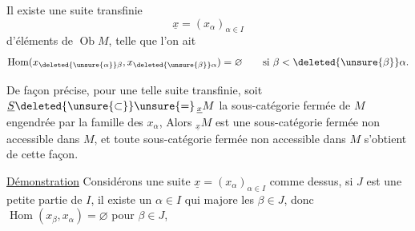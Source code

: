 Il existe une suite transfinie
\[
\underline x=(x_\alpha)_{\alpha\in I}
\]
d'éléments de $\operatorname{Ob}M$, telle que l'on ait
\[
\operatorname{Hom}(x_{\deleted{\unsure{\alpha}}\beta},x_{\deleted{\unsure{\beta}}\alpha})=\varnothing\qquad\text{si }\beta<\deleted{\unsure{\beta}}\alpha.
\]

De façon précise, pour une telle suite
transfinie, soit $\underline S\deleted{\unsure{\subset}}\unsure{=}\,{}_{\underline x}M$ la sous-catégorie
fermée de  $M$ engendrée par la
famille des $x_\alpha$, 
Alors $ {}_{\underline x}M$ est une
sous-catégorie fermée non accessible dans $M$,
et toute  sous-catégorie fermée non
accessible dans $M$ s'obtient de cette
façon.

\uline{Démonstration} Considérons une suite
$\underline x=(x_\alpha)_{\alpha\in I}$ comme dessus, 
 si $J$ est une
petite partie de $I$,  il existe
un $\alpha\in I$ qui majore les $\beta\in J$,
donc $\operatorname{Hom}(x_\beta,x_\alpha)=\varnothing$ pour $\beta\in J$,
